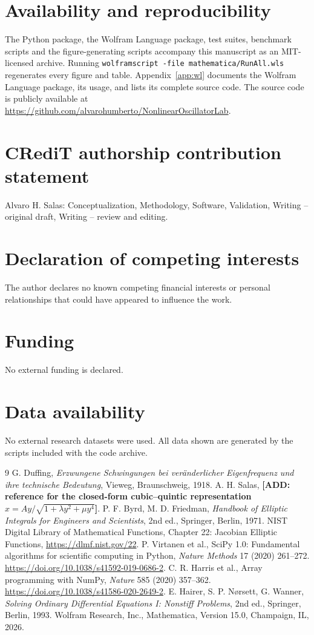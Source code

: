 \documentclass[11pt]{article}
\begin{document}
\section*{Availability and reproducibility}
The Python package, the Wolfram Language package, test suites, benchmark scripts and the figure-generating scripts accompany this manuscript as an MIT-licensed archive. Running \texttt{wolframscript -file mathematica/RunAll.wls} regenerates every figure and table. Appendix~\ref{app:wl} documents the Wolfram Language package, its usage, and lists its complete source code. The source code is publicly available at \url{https://github.com/alvarohumberto/NonlinearOscillatorLab}.
\section*{CRediT authorship contribution statement}
Alvaro H. Salas: Conceptualization, Methodology, Software, Validation, Writing -- original draft, Writing -- review and editing.
\section*{Declaration of competing interests}
The author declares no known competing financial interests or personal relationships that could have appeared to influence the work.
\section*{Funding}
No external funding is declared.
\section*{Data availability}
No external research datasets were used. All data shown are generated by the scripts included with the code archive.
\clearpage
\begin{thebibliography}{9}
 G. Duffing, \emph{Erzwungene Schwingungen bei ver\"anderlicher Eigenfrequenz und ihre technische Bedeutung}, Vieweg, Braunschweig, 1918.
 A. H. Salas, \textbf{[ADD: reference for the closed-form cubic--quintic representation $x=Ay/\sqrt{1+\lambda y^2+\mu y^4}$]}.
 P. F. Byrd, M. D. Friedman, \emph{Handbook of Elliptic Integrals for Engineers and Scientists}, 2nd ed., Springer, Berlin, 1971.
 NIST Digital Library of Mathematical Functions, Chapter 22: Jacobian Elliptic Functions, \url{https://dlmf.nist.gov/22}.
 P. Virtanen et al., SciPy 1.0: Fundamental algorithms for scientific computing in Python, \emph{Nature Methods} 17 (2020) 261--272. \url{https://doi.org/10.1038/s41592-019-0686-2}.
 C. R. Harris et al., Array programming with NumPy, \emph{Nature} 585 (2020) 357--362. \url{https://doi.org/10.1038/s41586-020-2649-2}.
 E. Hairer, S. P. N{\o}rsett, G. Wanner, \emph{Solving Ordinary Differential Equations I: Nonstiff Problems}, 2nd ed., Springer, Berlin, 1993.
 Wolfram Research, Inc., Mathematica, Version 15.0, Champaign, IL, 2026.
\end{thebibliography}
\end{document}
